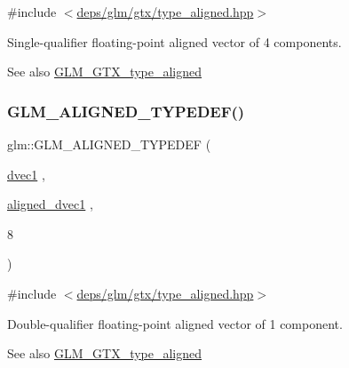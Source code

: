 {\ttfamily \#include $<$\hyperlink{gtx_2type__aligned_8hpp}{deps/glm/gtx/type\+\_\+aligned.\+hpp}$>$}

Single-\/qualifier floating-\/point aligned vector of 4 components. \begin{DoxySeeAlso}{See also}
\hyperlink{group__gtx__type__aligned}{G\+L\+M\+\_\+\+G\+T\+X\+\_\+type\+\_\+aligned} 
\end{DoxySeeAlso}
\mbox{\label{group__gtx__type__aligned_ga3e0f35fa0c626285a8bad41707e7316c}} 
\subsubsection{\texorpdfstring{G\+L\+M\+\_\+\+A\+L\+I\+G\+N\+E\+D\+\_\+\+T\+Y\+P\+E\+D\+E\+F()}{GLM\_ALIGNED\_TYPEDEF()}\hspace{0.1cm}{\footnotesize\ttfamily [155/209]}}
{\footnotesize\ttfamily glm\+::\+G\+L\+M\+\_\+\+A\+L\+I\+G\+N\+E\+D\+\_\+\+T\+Y\+P\+E\+D\+EF (\begin{DoxyParamCaption}\item[{\hyperlink{gtc_2vec1_8hpp_a8d5252eec287cf34cc18a219a118f9f2}{dvec1}}]{,  }\item[{\hyperlink{group__gtc__type__aligned_ga81fe4410dc880770293c53fcba83c9e4}{aligned\+\_\+dvec1}}]{,  }\item[{8}]{ }\end{DoxyParamCaption})}



{\ttfamily \#include $<$\hyperlink{gtx_2type__aligned_8hpp}{deps/glm/gtx/type\+\_\+aligned.\+hpp}$>$}

Double-\/qualifier floating-\/point aligned vector of 1 component. \begin{DoxySeeAlso}{See also}
\hyperlink{group__gtx__type__aligned}{G\+L\+M\+\_\+\+G\+T\+X\+\_\+type\+\_\+aligned} 
\end{DoxySeeAlso}
\mbox{\label{group__gtx__type__aligned_ga78bfec2f185d1d365ea0a9ef1e3d45b8}} 
